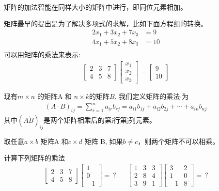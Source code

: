 \documentclass[12pt]{article}
\numberwithin{equation}{section}
\numberwithin{figure}{section}
\begin{document}
\begin{remark}
矩阵的加法智能在同样大小的矩阵中进行，即同位元素相加。	
\end{remark}

矩阵最早的提出是为了解决多项式的求解，比如下面方程组的转换。
\begin{align*}
	2x_1 + 3x_2 + 7x_3 & = 9 \\
	4x_1 + 5x_2 + 8 x_3 & = 10 \\
\end{align*}
可以用矩阵的乘法来表示:
\begin{align*}
	\begin{bmatrix}
		2 & 3 & 7 \\
		4 & 5 & 8 
	\end{bmatrix} \begin{bmatrix}
		x_1 \\
		x_2 \\
		x_3 
	\end{bmatrix} = \begin{bmatrix}
		 9 \\
		 10 
	\end{bmatrix}
\end{align*}

\begin{definition}
	现有$m \times n$ 的矩阵A 和 $n \times k$的矩阵$B$, 我们定义矩阵的乘法$\cdot$为
	\begin{align*}
		(A \cdot B)_{ij} = \sum_{r=1}^n a_{ir}b_{rj} = a_{i1}b_{1j} + a_{i2}b_{2j} + \cdots + a_{in}b_{nj}
	\end{align*}
	其中$(A \dot B)_{ij}$是两个矩阵相乘后的第i行第j列元素。
\end{definition}

\begin{remark}
取任意$a \times b$ 矩阵A 和$c \times d$ 矩阵 B, 如果$b \neq c$，则两个矩阵不可以相乘。	
\end{remark}

\begin{example}
计算下列矩阵的乘法
\begin{align*}
	\begin{bmatrix}
		2 & 3 & 7 \\
		4 & 5 & 8 
	\end{bmatrix} \begin{bmatrix}
		1 \\
		0 \\
		-1 
	\end{bmatrix} = \ ? & & \begin{bmatrix}
		1 & 3 & 3 \\
		2 & 8 & 4 \\
		3 & 9 & 1 
	\end{bmatrix} \begin{bmatrix}
		3 & 2 \\
		1 & 0 \\
		-1 & 8 
	\end{bmatrix} = \ ?
\end{align*}	
\end{example}
\end{document}
